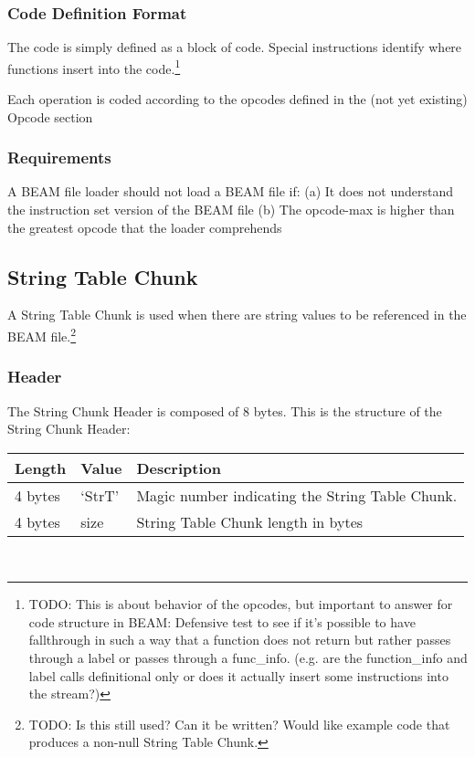 \documentclass{article}
\begin{document}
\subsubsection{Code Definition Format}
The code is simply defined as a block of code.  Special instructions 
identify where functions insert 
into the code.\footnote{TODO: This is about behavior of the opcodes, 
but important to answer for code structure in BEAM:
Defensive test to see if it's possible to have fallthrough in such a 
way that a function does not return
but rather passes through a label or passes through a func\_info.
(e.g. are the function\_info and label calls definitional only or 
does it actually insert some instructions into the stream?)}

Each operation is coded according to the opcodes defined in the (not yet existing) Opcode section


\subsubsection{Requirements}
A BEAM file loader should not load a BEAM file if:
(a) It does not understand the instruction set version of the BEAM file
(b) The opcode-max is higher than the greatest opcode that the loader comprehends

\subsection{String Table Chunk}
A String Table Chunk is used when there are string values to be referenced in the BEAM
file.\footnote{TODO: Is this still used?  Can it be written?  Would like example code
that produces a non-null String Table Chunk.}

\subsubsection{Header}
The String Chunk Header is composed of 8 bytes.
This is the structure of the String Chunk  Header:\\
\begin{tabular}{ |l|l|p{3in}| } \hline
Length  & Value  & Description\\ \hline
4 bytes & `StrT' & Magic number indicating the String Table Chunk.\\ \hline
4 bytes & size & String Table Chunk length in bytes\\ \hline
\end{tabular}\\
\end{document}
